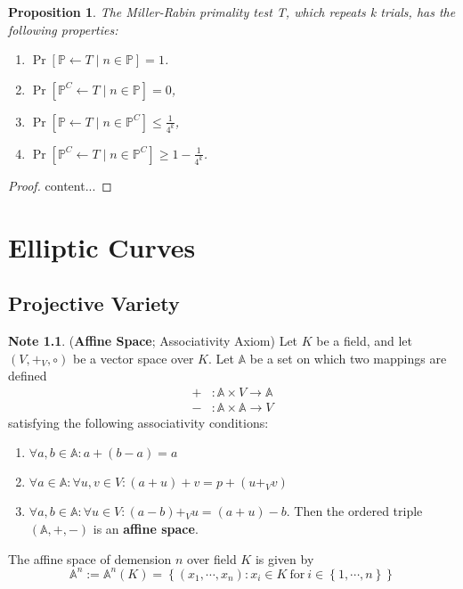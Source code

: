 \documentclass[12pt,openany]{book}
\newtheorem{proposition}[theorem]{Proposition}
\theoremstyle{definition}
\newtheorem*{note}{Note}
\newcommand{\set}[1]{\left\{#1\right\}}
\newcommand{\of}[1]{\left( #1 \right)}
\begin{document}
	\begin{tcolorbox}[colback=white,colframe=procolor,arc=5pt,title={\color{white}\bf }]
		\begin{proposition}
			The Miller-Rabin primality test T, which repeats k trials, has the following properties:
			\begin{enumerate}[(1)]
				\item $\Pr[\mathbb{P}\gets T\mid n\in\mathbb{P}]=1$.
				\item $\Pr[\mathbb{P}^C\gets T\mid n\in\mathbb{P}]=0$,
				\item $\Pr[\mathbb{P}\gets T\mid n\in\mathbb{P}^C]\leq\displaystyle\frac{1}{4^k}$,
				\item $\Pr[\mathbb{P}^C\gets T\mid n\in\mathbb{P}^C]\geq\displaystyle 1-\frac{1}{4^k}$.
			\end{enumerate}
		\end{proposition}
	\end{tcolorbox}
	\begin{proof}
		content...
	\end{proof}

	\newpage
	\chapter{Elliptic Curves}
	
	\section{Projective Variety}
	
	\begin{note}{(\textbf{Affine Space}; Associativity Axiom)}
		Let $K$ be a field, and let $\of{V,+_V,\circ}$ be a vector space over $K$. Let $\mathbb{A}$ be a set on which two mappings are defined \begin{align*}
			+&:\mathbb{A}\times V\to\mathbb{A}\\
			-&:\mathbb{A}\times\mathbb{A}\to V
		\end{align*} satisfying the following associativity conditions: \begin{enumerate}[(\text{A}1)]
			\item $\forall a,b\in\mathbb{A}:a+(b-a)=a$
			\item $\forall a\in\mathbb{A}:\forall u,v\in V:(a+u)+v=p+(u+_V v)$
			\item $\forall a,b\in\mathbb{A}:\forall u\in V:(a-b)+_V u=(a+u)-b$. Then the ordered triple $(\mathbb{A},+,-)$ is an \textbf{affine space}.
		\end{enumerate} The affine space of demension $n$ over field $K$ is given by \[
		\mathbb{A}^n:=\mathbb{A}^n(K)=\set{(x_1,\cdots,x_n):x_i\in K\ \text{for}\ i\in\set{1,\cdots,n}}
		\]
	\end{note}
	\vspace{8pt}
\end{document}
